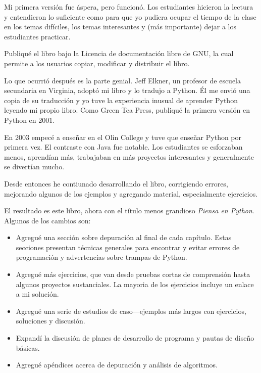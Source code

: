 \documentclass[10pt]{book}
\begin{document}
Mi primera versión fue áspera, pero funcionó.  Los estudiantes hicieron la
lectura y entendieron lo suficiente como para que yo pudiera ocupar el tiempo
de la clase en los temas difíciles, los temas interesantes y (más importante)
dejar a los estudiantes practicar.

Publiqué el libro bajo la Licencia de documentación libre de GNU,
la cual permite a los usuarios copiar, modificar y distribuir el libro.

Lo que ocurrió después es la parte genial.  Jeff Elkner, un profesor
de escuela secundaria en Virginia, adoptó mi libro y lo tradujo a Python.
Él me envió una copia de su traducción y yo tuve la experiencia inusual de
aprender Python leyendo mi propio libro. Como Green Tea Press,
publiqué la primera versión en Python en 2001.

En 2003 empecé a enseñar en el Olin College y tuve que enseñar Python
por primera vez.  El contraste con Java fue notable.
Los estudiantes se esforzaban menos, aprendían más, trabajaban en más
proyectos interesantes y generalmente se divertían mucho.

Desde entonces he contiunado desarrollando el libro,
corrigiendo errores, mejorando algunos de los ejemplos y agregando material,
especialmente ejercicios.

El resultado es este libro, ahora con el título menos grandioso
{\em Piensa en Python}.  Algunos de los cambios son:

\begin{itemize}

\item Agregué una sección sobre depuración al final de cada capítulo.
  Estas secciones presentan técnicas generales para encontrar y evitar
  errores de programación y advertencias sobre trampas de Python.

\item Agregué más ejercicios, que van desde pruebas cortas de comprensión
  hasta algunos proyectos sustanciales.  La mayoria de los ejercicios
  incluye un enlace a mi solución.

\item Agregué una serie de estudios de caso---ejemplos más largos con
  ejercicios, soluciones y discusión.

\item Expandí la discusión de planes de desarrollo de programa y
  pautas de diseño básicas.

\item Agregué apéndices acerca de depuración y análisis de algoritmos.

\end{itemize}
\end{document}
